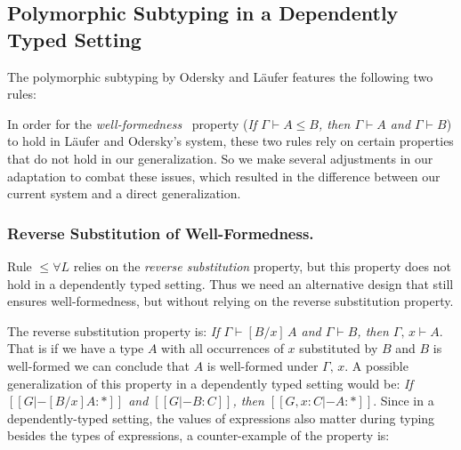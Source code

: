 \subsection{Polymorphic Subtyping in a Dependently Typed Setting}
\label{sec:adaptation}

The polymorphic subtyping by Odersky and L\"aufer features the following two rules:


In order for the \emph{well-formedness}~\cite{dunfield2013lemmas} property
(\emph{If $\Gamma \vdash A \le B$, then $\Gamma \vdash A$ and $\Gamma \vdash B$})
to hold in L\"aufer and Odersky's system, these two rules rely on certain properties
that do not hold in our generalization. So we make several adjustments
in our adaptation to combat these issues, which resulted in the difference between
our current system and a direct generalization.

\subsubsection{Reverse Substitution of Well-Formedness.}
Rule $\le\forall L$ relies on the \emph{reverse substitution} property, but this property
does not hold in a dependently typed setting. Thus we need an alternative design that
still ensures well-formedness, but without relying on the reverse substitution property.

The reverse substitution property is:
\emph{If $\Gamma \vdash [B / x] \, A$ and $\Gamma \vdash B$, then $\Gamma,\, x \vdash A$}.
That is if we have a type $A$ with all occurrences of $x$ substituted by $B$ and $B$
is well-formed we can conclude that $A$ is well-formed under $\Gamma,\, x$.
A possible generalization of this property in a dependently typed setting would be:
\emph{If $[[G |- [B / x] A : *]]$ and $[[G |- B : C]]$, then $[[G , x : C |- A : *]]$}.
Since in a dependently-typed setting, the values of expressions also matter during typing
besides the types of expressions, a counter-example of the property is:

